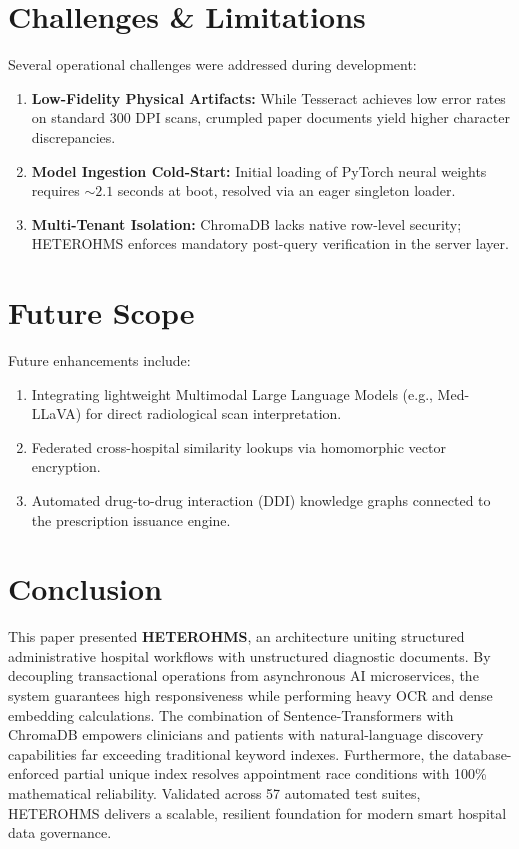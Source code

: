 \documentclass[conference]{IEEEtran}
\begin{document}
\section{Challenges \& Limitations}
Several operational challenges were addressed during development:
\begin{enumerate}
    \item \textbf{Low-Fidelity Physical Artifacts:} While Tesseract achieves low error rates on standard 300 DPI scans, crumpled paper documents yield higher character discrepancies.
    \item \textbf{Model Ingestion Cold-Start:} Initial loading of PyTorch neural weights requires $\sim 2.1$ seconds at boot, resolved via an eager singleton loader.
    \item \textbf{Multi-Tenant Isolation:} ChromaDB lacks native row-level security; HETEROHMS enforces mandatory post-query verification in the server layer.
\end{enumerate}

\section{Future Scope}
Future enhancements include:
\begin{enumerate}
    \item Integrating lightweight Multimodal Large Language Models (e.g., Med-LLaVA) for direct radiological scan interpretation.
    \item Federated cross-hospital similarity lookups via homomorphic vector encryption.
    \item Automated drug-to-drug interaction (DDI) knowledge graphs connected to the prescription issuance engine.
\end{enumerate}

\section{Conclusion}
This paper presented \textbf{HETEROHMS}, an architecture uniting structured administrative hospital workflows with unstructured diagnostic documents. By decoupling transactional operations from asynchronous AI microservices, the system guarantees high responsiveness while performing heavy OCR and dense embedding calculations. The combination of Sentence-Transformers with ChromaDB empowers clinicians and patients with natural-language discovery capabilities far exceeding traditional keyword indexes. Furthermore, the database-enforced partial unique index resolves appointment race conditions with 100\% mathematical reliability. Validated across 57 automated test suites, HETEROHMS delivers a scalable, resilient foundation for modern smart hospital data governance.



\end{document}
